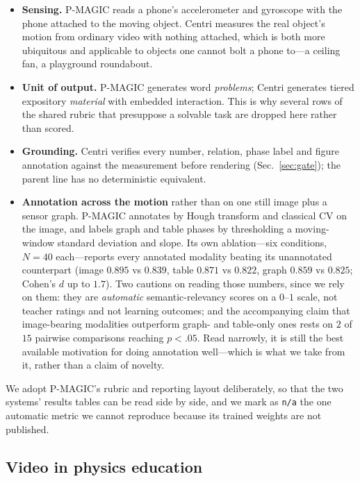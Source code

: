 \documentclass[conference]{IEEEtran}
\begin{document}
\begin{itemize}
\item \textbf{Sensing.} P-MAGIC reads a phone's accelerometer and gyroscope
with the phone attached to the moving object. Centri measures the real
object's motion from ordinary video with nothing attached, which is both more
ubiquitous and applicable to objects one cannot bolt a phone to---a ceiling
fan, a playground roundabout.
\item \textbf{Unit of output.} P-MAGIC generates word \emph{problems}; Centri
generates tiered expository \emph{material} with embedded interaction. This is
why several rows of the shared rubric that presuppose a solvable task are
dropped here rather than scored.
\item \textbf{Grounding.} Centri verifies every number, relation, phase label
and figure annotation against the measurement before rendering
(Sec.~\ref{sec:gate}); the parent line has no deterministic equivalent.
\item \textbf{Annotation across the motion} rather than on one still image
plus a sensor graph. P-MAGIC annotates by Hough transform and classical CV on
the image, and labels graph and table phases by thresholding a moving-window
standard deviation and slope. Its own ablation---six conditions, $N = 40$
each---reports every annotated modality beating its unannotated counterpart
(image $0.895$ vs $0.839$, table $0.871$ vs $0.822$, graph $0.859$ vs $0.825$;
Cohen's $d$ up to $1.7$). Two cautions on reading those numbers, since we rely
on them: they are \emph{automatic} semantic-relevancy scores on a $0$--$1$
scale, not teacher ratings and not learning outcomes; and the accompanying
claim that image-bearing modalities outperform graph- and table-only ones rests
on $2$ of $15$ pairwise comparisons reaching $p < .05$. Read narrowly, it is
still the best available motivation for doing annotation well---which is what
we take from it, rather than a claim of novelty.
\end{itemize}

We adopt P-MAGIC's rubric and reporting layout deliberately, so that the two
systems' results tables can be read side by side, and we mark as \texttt{n/a}
the one automatic metric we cannot reproduce because its trained weights are
not published.

\subsection{Video in physics education}
\end{document}
